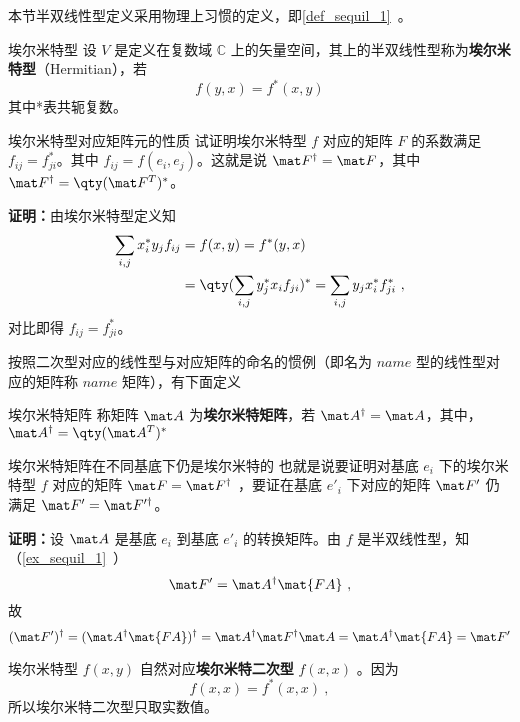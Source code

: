 本节半双线性型定义采用物理上习惯的定义，即\autoref{def_sequil_1}~。
\begin{definition}{埃尔米特型}
设 $V$ 是定义在复数域 $\mathbb{C}$ 上的矢量空间，其上的半双线性型称为\textbf{埃尔米特型}（Hermitian），若
\begin{equation}\label{eq_HeFor_2}
f(   y,   x)=f^*(   x,   y)
\end{equation}
其中*表共轭复数。
\end{definition}
\begin{example}{埃尔米特型对应矩阵元的性质}
试证明埃尔米特型 $f$ 对应的矩阵 $F$ 的系数满足 $f_{ij}=f_{ji}^*$。其中 $f_{ij}=f(   e_i,   e_j)$。这就是说 $\mat F^\dagger=\mat F$，其中 $\mat F^\dagger=\qty(\mat F^T)^*$。

\textbf{证明：}由埃尔米特型定义知
\begin{equation}
\begin{aligned}
\sum_{i,j}x_i^*y_j f_{ij}&=f(   x,   y)=f^*(   y,   x)\\
&=\qty(\sum_{i,j}y_j^* x_i f_{ji})^*=\sum_{i,j}y_j x_i^*f_{ji}^*~,
\end{aligned}
\end{equation}
对比即得 $f_{ij}=f_{ji}^*$。
\end{example}
按照二次型对应的线性型与对应矩阵的命名的惯例（即名为 $name$ 型的线性型对应的矩阵称 $name$ 矩阵），有下面定义
\begin{definition}{埃尔米特矩阵}
称矩阵 $\mat A$ 为\textbf{埃尔米特矩阵}，若 $\mat A^\dagger=\mat A$，其中，$\mat A^\dagger=\qty(\mat A^T)^*$
\end{definition}
\begin{example}{埃尔米特矩阵在不同基底下仍是埃尔米特的}
也就是说要证明对基底 $   e_i$ 下的埃尔米特型 $f$ 对应的矩阵 $\mat F=\mat F^\dagger$ ，要证在基底 $   e'_i$ 下对应的矩阵 $\mat F'$ 仍满足 $\mat F'=\mat F'^\dagger$。

\textbf{证明：}设 $\mat A$ 是基底 $  e_i$ 到基底 $   e'_i$ 的转换矩阵。由 $f$ 是半双线性型，知（\autoref{ex_sequil_1}~）
\begin{equation}
\mat F'=\mat A^\dagger \mat{FA}~,
\end{equation}
 故
\begin{equation}
(\mat F')^\dagger=(\mat A^\dagger \mat{FA})^\dagger=\mat A^\dagger \mat F^\dagger \mat A=\mat A^\dagger \mat{FA}=\mat F'
\end{equation}
\end{example}
埃尔米特型 $f(   x,   y)$ 自然对应\textbf{埃尔米特二次型} $f(   x,   x)$ 。因为
\begin{equation}
 f(   x,   x)= f^*(   x,   x) ~,
\end{equation}
所以埃尔米特二次型只取实数值。

